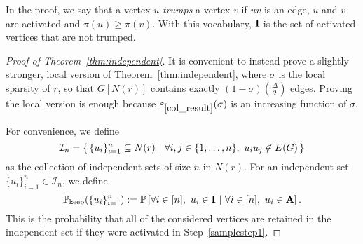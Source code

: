 In the proof, we say that a vertex $u$ \emph{trumps} a vertex $v$ if $uv$ is an edge,
$u$ and $v$ are activated and $\pi(u)\ge\pi(v)$.
With this vocabulary, ${\bf{I}}$ is the set of activated vertices that are not trumped.
\begin{proof}[Proof of Theorem~\ref{thm:independent}]
It is convenient to instead prove a slightly stronger, local version of Theorem~\ref{thm:independent},
where $\sigma$ is the local sparsity of $r$, so that $G[N(r)]$
contains exactly $(1-\sigma)\binom{\Delta}{2}$ edges.
Proving the local version is enough because
$\varepsilon_{\ref{col_result}}(\sigma)$ is an increasing function of $\sigma$.

For convenience, we define
\[
 {\mathcal{I}}_n=\left\{\,\{u_i\}_{i=1}^n\subseteq N(r) \,\,\middle|\,\, \forall i,j\in\{1,\dots,n\}, ~u_iu_j\not\in E(G)\,\right\}
\]
 as the collection of independent sets of size $n$ in $N(r)$.
For an independent set
$\{u_i\}_{i=1}^n\in \mathcal{I}_n$, we define
\[
 \mathbb{P}_{\text{keep}}(\{u_i\}_{i=1}^n):=\mathbb{P}\left[\forall i\in[n],~u_i\in {\bf{I}} \,\,\middle|\,\, \forall i\in[n],~u_i \in {\bf{A}}\right].
\]
 This is the probability that all of the considered vertices
are retained in the independent set if they were activated in Step~\ref{samplestep1}.


\end{proof}
